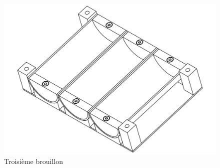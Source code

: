 \begin{figure}
    \centering
    \includegraphics[width=\textwidth]{Graphics/Reservoir_final/TROISIEME_BROUILLON.pdf}
    \caption{Troisième brouillon}
\end{figure}



